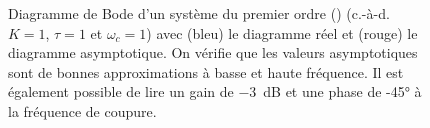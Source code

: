 \afterpage{\clearpage}
\begin{figure}[!t]
\centering
{}



\caption{Diagramme de Bode d'un système du premier ordre 
         () (c.-à-d. $K=1$, $\tau=1$ et $\omega_c=1$) avec 
         (bleu) le diagramme réel et (rouge) le diagramme asymptotique. On 
         vérifie que les valeurs asymptotiques sont de bonnes approximations 
         à basse et haute fréquence. Il est également possible de lire un 
         gain de \SI{-3}{\dB} et une phase de -45\si{\degree} à la fréquence 
         de coupure.\label{fig-bode_1er_3}}
\end{figure}
